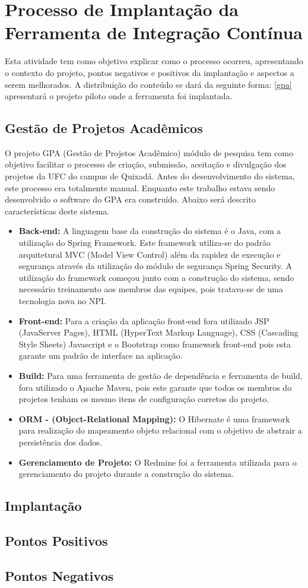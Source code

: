 \section{Processo de Implantação da Ferramenta de Integração Contínua}
Esta atividade tem como objetivo explicar como o processo ocorreu, apresentando o contexto do projeto, pontos negativos e positivos da implantação e aspectos a serem melhorados. A distribuição do conteúdo se dará da seguinte forma: \autoref{gpa} apresentará o projeto piloto onde a ferramenta foi implantada.


\subsection{Gestão de Projetos Acadêmicos }\label{gpa}
O projeto GPA (Gestão de Projetos Acadêmico) módulo de pesquisa tem como objetivo facilitar o processo de criação, submissão, aceitação e divulgação dos projetos da UFC do campus de Quixadá. Antes do desenvolvimento do sistema, este processo era totalmente manual. Enquanto este trabalho estava sendo desenvolvido o software do GPA era construído. Abaixo será descrito características deste sistema.

\begin{itemize}
	\item \textbf{Back-end:} A linguagem base da construção do sistema é o Java, com a utilização do Spring Framework. Este framework utiliza-se do padrão arquitetural MVC (Model View Control) além da rapidez de execução e segurança através da utilização do módulo de segurança Spring Security. A utilização do framework começou junto com a construção do sistema, sendo necessário treinamento aos membros das equipes, pois tratava-se de uma tecnologia nova no NPI.
	
	\item \textbf{Front-end:} Para a criação da aplicação front-end fora utilizado JSP (JavaServer Pages), HTML (HyperText Markup Language), CSS (Cascading Style Sheets) Javascript e o Bootstrap como framework front-end pois esta garante um padrão de interface na aplicação.
	
	\item \textbf{Build:} Para uma ferramenta de gestão de dependência e ferramenta de build, fora utilizado o Apache Maven, pois este garante que todos os membros do projetos tenham os mesmo itens de configuração corretos do projeto.
	
	\item \textbf{ORM - (Object-Relational Mapping):} O Hibernate é uma framework para realização do mapeamento objeto relacional com o objetivo de abstrair a persistência dos dados.
	
	\item \textbf{Gerenciamento de Projeto:} O Redmine foi a ferramenta utilizada para o gerenciamento do projeto durante a construção do sistema.
\end{itemize}

\subsection{Implantação}

\subsection{Pontos Positivos}

\subsection{Pontos Negativos}